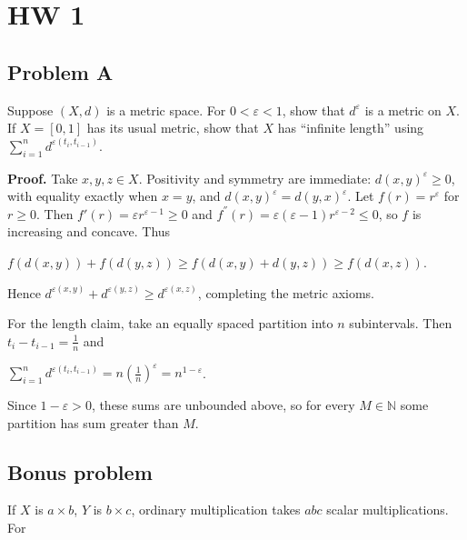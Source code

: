 \chapter{HW 1}

\section{Problem A}

Suppose \(\left( {X,d} \right)\) is a metric space. For \(0 < \varepsilon < 1\), show that \(d^{\varepsilon}\) is a metric on \(X\). If \(X = \left\lbrack {0,1} \right\rbrack\) has its usual metric, show that \(X\) has ``infinite length'' using \(\sum_{i = 1}^{n}d^{\varepsilon{({t_{i},t_{i - 1}})}}\).

\textbf{Proof.} Take \(x,y,z \in X\). Positivity and symmetry are immediate: \({d\left( {x,y} \right)}^{\varepsilon} \geq 0\), with equality exactly when \(x = y\), and \({d\left( {x,y} \right)}^{\varepsilon} = {d\left( {y,x} \right)}^{\varepsilon}\). Let \(f(r) = r^{\varepsilon}\) for \(r \geq 0\). Then \(f'(r) = \varepsilon r^{\varepsilon - 1} \geq 0\) and \(f^{''}(r) = \varepsilon\left( {\varepsilon - 1} \right)r^{\varepsilon - 2} \leq 0\), so \(f\) is increasing and concave. Thus

\(f\left( {d\left( {x,y} \right)} \right) + f\left( {d\left( {y,z} \right)} \right) \geq f\left( {d\left( {x,y} \right) + d\left( {y,z} \right)} \right) \geq f\left( {d\left( {x,z} \right)} \right)\).

Hence \(d^{\varepsilon{({x,y})}} + d^{\varepsilon{({y,z})}} \geq d^{\varepsilon{({x,z})}}\), completing the metric axioms.

For the length claim, take an equally spaced partition into \(n\) subintervals. Then \(t_{i} - t_{i - 1} = \frac{1}{n}\) and

\(\sum_{i = 1}^{n}d^{\varepsilon{({t_{i},t_{i - 1}})}} = {n\left( \frac{1}{n} \right)}^{\varepsilon} = n^{1 - \varepsilon}\).

Since \(1 - \varepsilon > 0\), these sums are unbounded above, so for every \(M \in \mathbb{N}\) some partition has sum greater than \(M\).

\section{Bonus problem}

If \(X\) is \(a \times b\), \(Y\) is \(b \times c\), ordinary multiplication takes \(abc\) scalar multiplications. For

